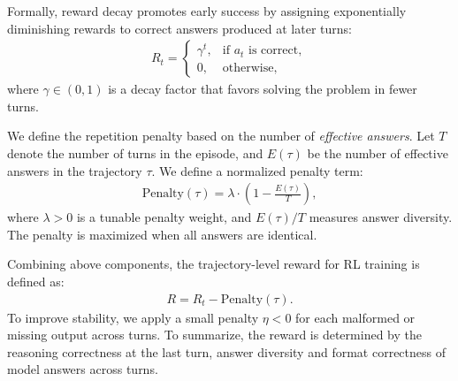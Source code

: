 Formally, reward decay promotes early success by assigning exponentially diminishing rewards to correct answers produced at later turns:
\begin{align}
R_t = 
\begin{cases}
\gamma^t, & \text{if } a_t \text{ is correct}, \\
0, & \text{otherwise},
\end{cases}
\end{align}
where $\gamma \in (0, 1)$ is a decay factor that favors solving the problem in fewer turns.

We define the repetition penalty based on the number of \textit{effective answers}. Let $T$ denote the number of turns in the episode, and $E(\tau)$ be the number of effective answers in the trajectory $\tau$. We define a normalized penalty term:
\begin{align}
\text{Penalty}(\tau) = \lambda \cdot \left(1 - \frac{E(\tau)}{T} \right),
\label{eq:penalty}
\end{align}
where $\lambda > 0$ is a tunable penalty weight, and $E(\tau)/T$ measures answer diversity. The penalty is maximized when all answers are identical.

Combining above components, the trajectory-level reward for RL training is defined as:
\begin{align}
R =
R_t - \text{Penalty}(\tau).
\end{align}
To improve stability, we apply a small penalty $\eta < 0$ for each malformed or missing output across turns.
To summarize, the reward is determined by the reasoning correctness at the last turn, answer diversity and format correctness of model answers across turns. 

